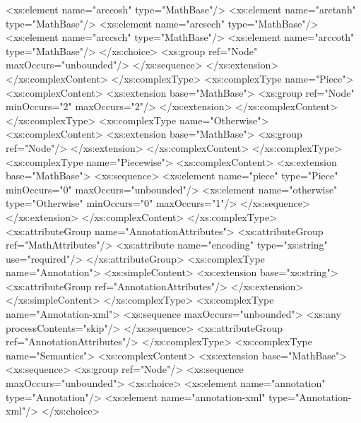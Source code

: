 \begin{example}
\begin{footnotesize}
                        <xs:element name="arccosh" type="MathBase"/>
                        <xs:element name="arctanh" type="MathBase"/>
                        <xs:element name="arcsech" type="MathBase"/>
                        <xs:element name="arccsch" type="MathBase"/>
                        <xs:element name="arccoth" type="MathBase"/>
                    </xs:choice>
                    <xs:group ref="Node" maxOccurs="unbounded"/>
                </xs:sequence>
            </xs:extension>
        </xs:complexContent>
    </xs:complexType>
    <xs:complexType name="Piece">
        <xs:complexContent>
            <xs:extension base="MathBase">
                <xs:group ref="Node" minOccurs="2" maxOccurs="2"/>
            </xs:extension>
        </xs:complexContent>
    </xs:complexType>
    <xs:complexType name="Otherwise">
        <xs:complexContent>
            <xs:extension base="MathBase">
                <xs:group ref="Node"/>
            </xs:extension>
        </xs:complexContent>
    </xs:complexType>
    <xs:complexType name="Piecewise">
        <xs:complexContent>
            <xs:extension base="MathBase">
                <xs:sequence>
                    <xs:element name="piece" type="Piece" minOccurs="0" maxOccurs="unbounded"/>
                    <xs:element name="otherwise" type="Otherwise" minOccurs="0" maxOccurs="1"/>
                </xs:sequence>
            </xs:extension>
        </xs:complexContent>
    </xs:complexType>
    <xs:attributeGroup name="AnnotationAttributes">
        <xs:attributeGroup ref="MathAttributes"/>
        <xs:attribute name="encoding" type="xs:string" use="required"/>
    </xs:attributeGroup>
    <xs:complexType name="Annotation">
        <xs:simpleContent>
            <xs:extension base="xs:string">
                <xs:attributeGroup ref="AnnotationAttributes"/>
            </xs:extension>
        </xs:simpleContent>
    </xs:complexType>
    <xs:complexType name="Annotation-xml">
        <xs:sequence maxOccurs="unbounded">
            <xs:any processContents="skip"/>
        </xs:sequence>
        <xs:attributeGroup ref="AnnotationAttributes"/>
    </xs:complexType>
    <xs:complexType name="Semantics">
        <xs:complexContent>
            <xs:extension base="MathBase">
                <xs:sequence>
                    <xs:group ref="Node"/>
                    <xs:sequence maxOccurs="unbounded">
                        <xs:choice>
                            <xs:element name="annotation" type="Annotation"/>
                            <xs:element name="annotation-xml" type="Annotation-xml"/>
                        </xs:choice>

\end{footnotesize}
\end{example}
